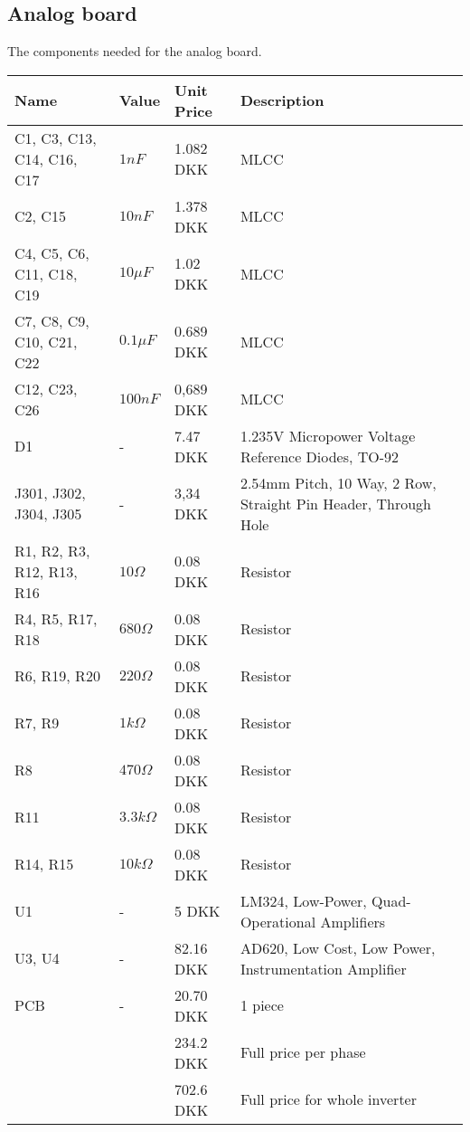 \newpage
\subsection{Analog board}
The components needed for the analog board.
\begin{table}[H]
\centering
\footnotesize
\begin{tabular}{|p{4cm} p{1.5cm} p{2.2cm} p{6cm}|} \hline
\textbf{Name}              & \textbf{Value} & \textbf{Unit Price}    & \textbf{Description} \\ \hline
C1, C3, C13, C14, C16, C17 & $1nF$          & 1.082 DKK          &     MLCC  \\
C2, C15                    & $10nF$         & 1.378 DKK          &     MLCC  \\
C4, C5, C6, C11, C18, C19  & $10\mu F$      & 1.02 DKK          &     MLCC  \\
C7, C8, C9, C10, C21, C22  & $0.1\mu F$     & 0.689 DKK           &     MLCC \\
C12, C23, C26              & $100nF$        & 0,689 DKK          &     MLCC  \\
D1                         & -              & 7.47 DKK & 1.235V Micropower Voltage Reference Diodes, TO-92   \\
J301, J302, J304, J305     &  -             & 3,34 DKK & 2.54mm Pitch, 10 Way, 2 Row, Straight Pin Header, Through Hole \\
R1, R2, R3, R12, R13, R16  & $10 \Omega$    & 0.08 DKK& Resistor  \\
R4, R5, R17, R18           & $680 \Omega$   & 0.08 DKK& Resistor  \\
R6, R19, R20               & $220 \Omega$   & 0.08 DKK& Resistor  \\
R7, R9                     & $1k \Omega$    & 0.08 DKK& Resistor  \\
R8                         & $470 \Omega$   & 0.08 DKK& Resistor  \\
R11                        & $3.3k \Omega$  & 0.08 DKK& Resistor  \\
R14, R15                   & $10k \Omega$   & 0.08 DKK& Resistor \\
U1                         & -              & 5    DKK& LM324, Low-Power, Quad-Operational Amplifiers       \\
U3, U4                     & -              & 82.16 DKK& AD620, Low Cost, Low Power, Instrumentation Amplifier \\ 
PCB               & -                  & 20.70 DKK  & 1 piece         \\ \hline
& & 234.2 DKK & Full price per phase \\ \hline
& & 702.6 DKK & Full price for whole inverter \\ \hline
\end{tabular}
\end{table}




